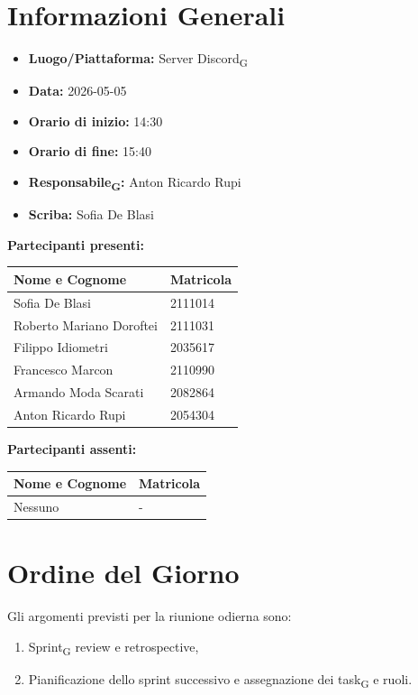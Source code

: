 \section{Informazioni Generali}
\begin{itemize}
	\item \textbf{Luogo/Piattaforma:} Server Discord\textsubscript{G}
	\item \textbf{Data:} 2026-05-05
	\item \textbf{Orario di inizio:} 14:30
	\item \textbf{Orario di fine:} 15:40
	\item \textbf{Responsabile\textsubscript{G}:} Anton Ricardo Rupi
	\item \textbf{Scriba:} Sofia De Blasi
\end{itemize}

\vspace{0.5cm}
\textbf{Partecipanti presenti:}
\begin{table}[ht]
	\centering
	\renewcommand{\arraystretch}{1.2}
	\begin{tabularx}{\textwidth}{X l}
		\toprule
		\textbf{Nome e Cognome} & \textbf{Matricola} \\
		\midrule
		Sofia De Blasi & 2111014 \\
		Roberto Mariano Doroftei & 2111031 \\
		Filippo Idiometri & 2035617 \\
		Francesco Marcon & 2110990 \\
		Armando Moda Scarati & 2082864 \\
		Anton Ricardo Rupi & 2054304 \\
		\bottomrule
	\end{tabularx}
\end{table}

\vspace{0.5cm}
\textbf{Partecipanti assenti:}
\begin{table}[ht]
	\centering
	\renewcommand{\arraystretch}{1.2}
	\begin{tabularx}{\textwidth}{X l}
		\toprule
		\textbf{Nome e Cognome} & \textbf{Matricola} \\
		\midrule
		Nessuno & - \\
		\bottomrule
	\end{tabularx}
\end{table}

\section{Ordine del Giorno}
Gli argomenti previsti per la riunione odierna sono:
\begin{enumerate}
	\item Sprint\textsubscript{G} review e retrospective,
	\item Pianificazione dello sprint successivo e assegnazione dei task\textsubscript{G} e ruoli.
\end{enumerate}

